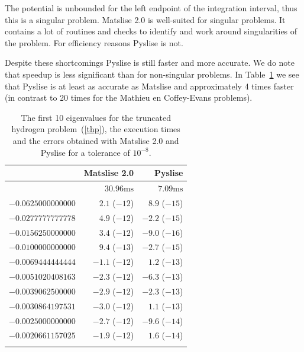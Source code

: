 The potential is unbounded for the left endpoint of the integration interval, thus this is a singular problem. Matslise 2.0 is well-suited for singular problems. It contains a lot of routines and checks to identify and work around singularities of the problem. For efficiency reasons Pyslise is not.

Despite these shortcomings Pyslise is still faster and more accurate. We do note that speedup is less significant than for non-singular problems. In Table~\ref{tab:c2_tab7} we see that Pyslise is at least as accurate as Matslise and approximately 4 times faster (in contrast to 20 times for the Mathieu en Coffey-Evans problems).

\begin{table}
    \begin{center}
        \begin{tabular}[]{rrr}
            \toprule
                               & Matslise 2.0     & Pyslise         \\
            \midrule
                               & $30.96\text{ms}$ & $7.09\text{ms}$ \\
            $-0.0625000000000$ & $2.1$ ($-12$)    & $8.9$ ($-15$)   \\
            $-0.0277777777778$ & $4.9$ ($-12$)    & $-2.2$ ($-15$)  \\
            $-0.0156250000000$ & $3.4$ ($-12$)    & $-9.0$ ($-16$)  \\
            $-0.0100000000000$ & $9.4$ ($-13$)    & $-2.7$ ($-15$)  \\
            $-0.0069444444444$ & $-1.1$ ($-12$)   & $1.2$ ($-13$)   \\
            $-0.0051020408163$ & $-2.3$ ($-12$)   & $-6.3$ ($-13$)  \\
            $-0.0039062500000$ & $-2.9$ ($-12$)   & $-2.3$ ($-13$)  \\
            $-0.0030864197531$ & $-3.0$ ($-12$)   & $1.1$ ($-13$)   \\
            $-0.0025000000000$ & $-2.7$ ($-12$)   & $-9.6$ ($-14$)  \\
            $-0.0020661157025$ & $-1.9$ ($-12$)   & $1.6$ ($-14$)   \\
                               &                  &                 \\
            \bottomrule
        \end{tabular}
        \caption{\label{tab:c2_tab7}The first 10 eigenvalues for the truncated hydrogen problem~(\ref{thp}),
            the execution times and the errors obtained with Matslise 2.0 and Pyslise for a tolerance of $10^{-8}$.  }
    \end{center}
\end{table}

